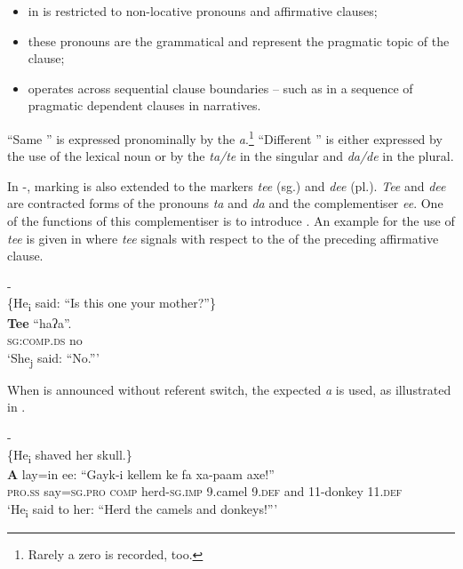 \documentclass[output=paper,newtxmath,modfonts,nonflat,hidelinks]{langsci/langscibook}
\begin{document}
\begin{itemize}
\item {} in  is restricted to non-locative   pronouns and affirmative clauses;

\item these pronouns are the grammatical  and represent the pragmatic topic of the clause;

\item {} operates across sequential clause boundaries -- such as in a sequence of pragmatic dependent clauses in narratives.
\end{itemize}

“Same ” is expressed pronominally by the  \textit{a}.\footnote{Rarely a zero  is recorded, too.}  “Different ” is either expressed by the use of the lexical noun or by the  \textit{ta/te} in the singular and \textit{da/de} in the plural.

In -,  marking is also extended to the  markers \textit{tee} (sg.) and \textit{dee} (pl.). \textit{Tee} and \textit{dee} are contracted forms of the pronouns \textit{ta} and \textit{da} and the complementiser \textit{ee}. One of the functions of this complementiser is to introduce . An example for the use of \textit{tee} is given in  where \textit{tee} signals  with respect to the  of the preceding affirmative clause. 

\ea\label{ex:apel:21}
{- \citep[285]{Faye1979}}\\
{\-\hspace{0cm}\{He\textsubscript{i} said: “Is this one your mother?”\}}\\
\gll \textbf{Tee} “haʔa”.\\
     \textsc{sg:comp.ds} no \\
\glt ‘She\textsubscript{j} said: “No.”’
\z

When  is announced without referent switch, the expected  \textit{a} is used, as illustrated in . 

\ea\label{ex:apel:22}
{- \citep[284]{Faye1979}}\\
{\-\hspace{0cm}\{He\textsubscript{i} shaved her skull.\}}\\
\gll \textbf{A} lay=in ee: “Gayk-i kellem ke fa xa-paam axe!”\\
     \textsc{pro.ss} say\textsc{=sg.pro} \textsc{comp} herd\textsc{-sg.imp} \textsc{9.}camel \textsc{9.def} and \textsc{11-}donkey \textsc{11.def} \\
\glt ‘He\textsubscript{i} said to her: “Herd the camels and donkeys!”’
\z
\end{document}
